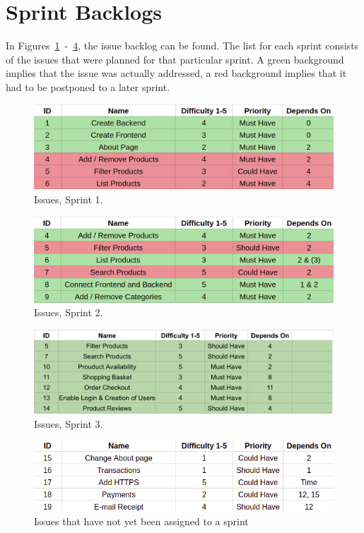 \newpage

\section{Sprint Backlogs}\label{sec:backlog}

In Figures~\ref{fig:sprint_1}~-~\ref{fig:sprint_4}, the issue backlog can
be found. The list for each sprint consists of the issues that were planned
for that particular sprint. A green background implies that the issue was
actually addressed, a red background implies that it had to be postponed to
a later sprint.

\begin{figure}[H]
\centering
\includegraphics[width=\textwidth]{third_sprint/sprint_1.png}
\caption{\label{fig:sprint_1} Issues, Sprint 1.}
\end{figure}

\begin{figure}[H]
\centering
\includegraphics[width=\textwidth]{third_sprint/sprint_2.png}
\caption{\label{fig:sprint_2} Issues, Sprint 2.}
\end{figure}

\begin{figure}[H]
\centering
\includegraphics[width=\textwidth]{third_sprint/sprint_3_2.png}
\caption{\label{fig:sprint_3} Issues, Sprint 3.}
\end{figure}

\begin{figure}[H]
\centering
\includegraphics[width=\textwidth]{third_sprint/other.png}
\caption{\label{fig:sprint_4} Issues that have not yet been assigned to
a sprint}
\end{figure}
